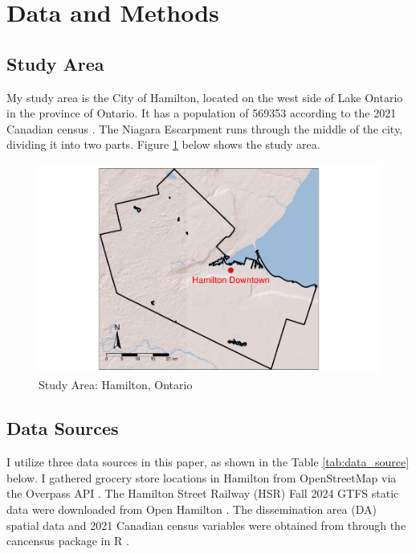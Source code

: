 \documentclass[preprint, 3p,
authoryear]{elsarticle} %
\begin{document}
\section{Data and Methods}\label{data-and-methods}

\subsection{Study Area}\label{study-area}

My study area is the City of Hamilton, located on the west side of Lake
Ontario in the province of Ontario. It has a population of 569353
according to the 2021 Canadian census \citep{census}. The Niagara
Escarpment runs through the middle of the city, dividing it into two
parts. Figure \ref{fig:study_area} below shows the study area.

\begin{figure}
\centering
\includegraphics{grocery_store_hamilton_files/figure-latex/unnamed-chunk-4-1.pdf}
\caption{\label{fig:study_area}Study Area: Hamilton, Ontario}
\end{figure}

\subsection{Data Sources}\label{data-sources}

I utilize three data sources in this paper, as shown in the Table
\ref{tab:data_source} below. I gathered grocery store locations in
Hamilton from OpenStreetMap \citep{osm} via the Overpass API
\citep{overpass}. The Hamilton Street Railway (HSR) Fall 2024 GTFS
static data were downloaded from Open Hamilton \citep{hsr_gtfs}. The
dissemination area (DA) spatial data and 2021 Canadian census variables
were obtained from \citet{census} through the cancensus package in R
\citep{cancensus}.
\end{document}

